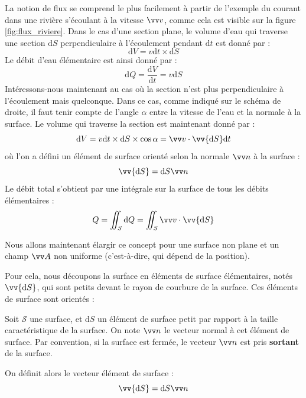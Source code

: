 \documentclass[11pt,fleqn]{book} %
\newcommand{\dd}{\mathrm{d}}
\begin{document}
\begin{encart}
La notion de flux se comprend le plus facilement à partir de l'exemple du courant dans une rivière s'écoulant à la vitesse $\vv v$, comme cela est visible sur la figure \ref{fig:flux_riviere}. Dans le cas d'une section plane, le volume d'eau qui traverse une section $\dd S$ perpendiculaire à l'écoulement pendant $\dd t$ est donné par :
\begin{equation}
    \dd V = v \dd t \times \dd S
\end{equation}
Le débit d'eau élémentaire est ainsi donné par :
\begin{equation}
    \dd Q = \frac{\dd V}{\dd t}
 = v \dd S
 \end{equation}
 Intéressons-nous maintenant au cas où la section n'est plus perpendiculaire à l'écoulement mais quelconque. Dans ce cas, comme indiqué sur le schéma de droite, il faut tenir compte de l'angle $\alpha$ entre la vitesse de l'eau et la normale à la surface. Le volume qui traverse la section est maintenant donné par :
 \begin{equation}
    \dd V = v \dd t \times \dd S \times \cos \alpha = \vv v \cdot \vv{\dd S} \dd t
\end{equation}
où l'on a défini un élément de surface orienté selon la normale $\vv n$ à la surface :
\begin{equation}
    \vv{\dd S} = \dd S \vv n
\end{equation}
Le débit total s'obtient par une intégrale sur la surface de tous les débits élémentaires :
\begin{equation}
    Q = \iint_S \dd Q = \iint_S \vv v \cdot \vv{\dd S}
\end{equation}
\end{encart}

Nous allons maintenant élargir ce concept pour une surface non plane et un champ $\vv A$ non uniforme (c'est-à-dire, qui dépend de la position). 

Pour cela, nous découpons la surface en éléments de surface élémentaires, notés $\vv{\dd S}$, qui sont petits devant le rayon de courbure de la surface. Ces éléments de surface sont orientés :

\begin{definition}
    Soit $\mathcal{S}$ une surface, et $\dd S$ un élément de surface petit par rapport à la taille caractéristique de la surface. On note $\vv n$ le vecteur normal à cet élément de surface. Par convention, si la surface est fermée, le vecteur $\vv n$ est pris \textbf{sortant} de la surface.

    On définit alors le vecteur élément de surface :
\begin{equation}
    \vv{\dd S} = \dd S \vv n
\end{equation}
\end{definition}
\end{document}
